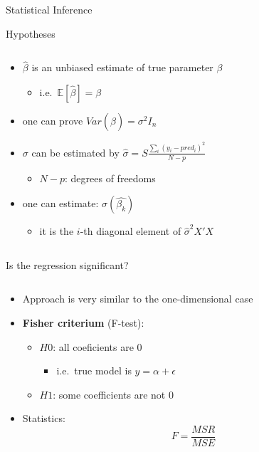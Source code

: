 \documentclass[
  ignorenonframetext,
  aspectratio=169,
]{beamer}
\providecommand{\tightlist}{%
  \setlength{\itemsep}{0pt}\setlength{\parskip}{0pt}}\usepackage{longtable,booktabs,array}
\begin{document}
\begin{frame}{Statistical Inference}
\begin{block}{Hypotheses}
\begin{columns}[T]
\begin{column}{0.48\textwidth}
\begin{itemize}
  \begin{itemize}
  \tightlist
  \item
    \(\hat{\beta}\) is an unbiased estimate of true parameter \(\beta\)

    \begin{itemize}
    \tightlist
    \item
      i.e.~\(\mathbb{E} [\hat{\beta}] = \beta\)
    \end{itemize}
  \item
    one can prove \(Var(\hat{\beta}) = \sigma^2 I_n\)
  \item
    \(\sigma\) can be estimated by
    \(\hat{\sigma}=S\frac{\sum_i (y_i-{pred}_i)^2}{N-p}\)

    \begin{itemize}
    \tightlist
    \item
      \(N-p\): degrees of freedoms
    \end{itemize}
  \item
    one can estimate: \(\sigma(\hat{\beta_k})\)

    \begin{itemize}
    \tightlist
    \item
      it is the \(i\)-th diagonal element of \(\hat{\sigma}^2 X'X\)
    \end{itemize}
  \end{itemize}
\end{itemize}
\end{column}
\end{columns}
\end{block}

\begin{block}{Is the regression significant?}
\protect\hypertarget{is-the-regression-significant}{}
\begin{columns}[T]
\begin{column}{0.48\textwidth}
\begin{itemize}
\tightlist
\item
  Approach is very similar to the one-dimensional case
\item
  \textbf{Fisher criterium} (F-test):

  \begin{itemize}
  \tightlist
  \item
    \(H0\): all coeficients are 0

    \begin{itemize}
    \tightlist
    \item
      i.e.~true model is \(y=\alpha + \epsilon\)
    \end{itemize}
  \item
    \(H1\): some coefficients are not 0
  \end{itemize}
\item
  Statistics: \[F=\frac{MSR}{MSE}\]


\end{itemize}
\end{column}
\end{columns}
\end{block}
\end{frame}
\end{document}
